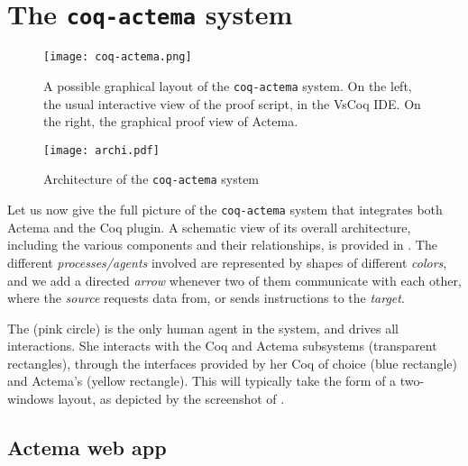 \section{The \texttt{coq-actema} system}
\begin{figure*}
  \texttt{[image: coq-actema.png]}
  \caption{ A possible graphical layout of the \texttt{coq-actema} system. On
    the left, the usual interactive view of the proof script, in the VsCoq IDE.
    On the right, the graphical proof view of Actema.}
\end{figure*}

\begin{figure*}
  \texttt{[image: archi.pdf]}
  \caption{Architecture of the \texttt{coq-actema} system}
\end{figure*}


Let us now give the full picture of the \texttt{coq-actema} system that
integrates both Actema and the Coq plugin. A schematic view of its overall
architecture, including the various components and their relationships, is
provided in . The different \emph{processes/agents} involved are
represented by shapes of different \emph{colors}, and we add a directed
\emph{arrow} whenever two of them communicate with each other, where the
\emph{source} requests data from, or sends instructions to the \emph{target}.

The  (pink circle) is the only human agent in the system, and
drives all interactions. She interacts with the Coq and Actema subsystems
(transparent rectangles), through the interfaces provided by her Coq
 of choice (blue rectangle) and Actema's  (yellow
rectangle). This will typically take the form of a two-windows layout, as
depicted by the screenshot of .

\subsection{Actema web app}

